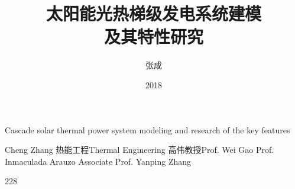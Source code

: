 \makenomenclature

\title{太阳能光热梯级发电系统建模\\及其特性研究}{Cascade solar thermal power system modeling and research of the key features}
\author
{张成}{Cheng Zhang}
\major
{热能工程}{Thermal Engineering}
\supervisor
{高伟\hspace{0.2em}教授}{Prof. Wei Gao \newline Prof. Inmaculada Arauzo \newline Associate Prof. Yanping Zhang}
\date{2018}{2}{28}
